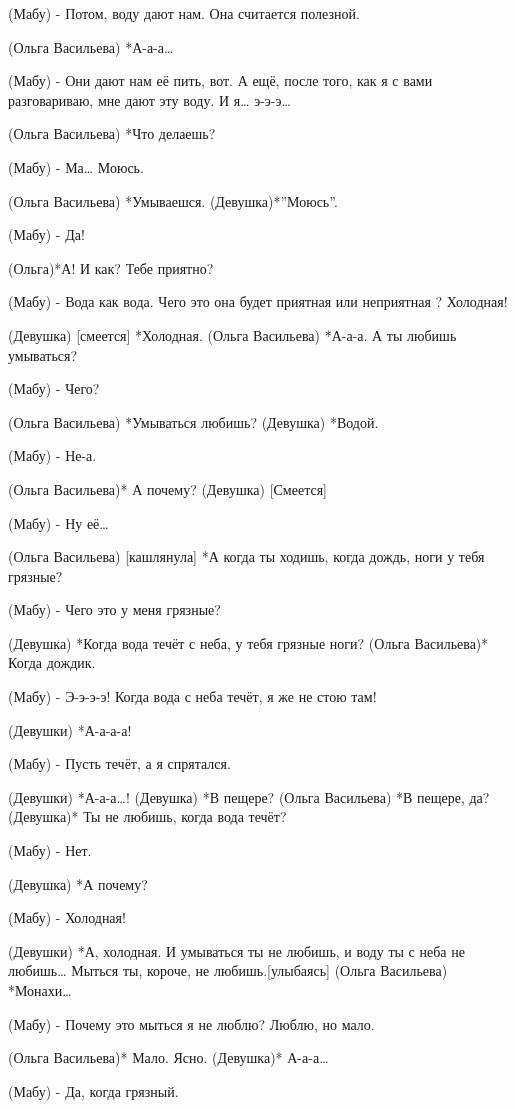 (Мабу) - Потом, воду дают нам. Она считается полезной.

(Ольга Васильева) *А-а-а…

(Мабу)  - Они дают нам её пить, вот. А ещё, после того, как я с вами разговариваю,  мне дают эту воду. И я… э-э-э…

(Ольга Васильева) *Что делаешь?

(Мабу) - Ма… Моюсь.
 
(Ольга Васильева) *Умываешся.
(Девушка)*”Моюсь”.

(Мабу) - Да!

(Ольга)*А! И как? Тебе приятно?

(Мабу) - Вода как вода. Чего это она будет  приятная или неприятная ? Холодная!

(Девушка) [смеется] *Холодная.
(Ольга Васильева) *А-а-а. А ты любишь умываться?

(Мабу) - Чего?

(Ольга Васильева) *Умываться любишь?
(Девушка) *Водой.

(Мабу) - Не-а.

(Ольга Васильева)* А почему?
(Девушка) [Смеется]

(Мабу) - Ну её… 

(Ольга Васильева) [кашлянула] *А когда ты ходишь, когда дождь, ноги у тебя грязные?

(Мабу) - Чего это у меня грязные?

(Девушка) *Когда вода течёт с неба, у тебя грязные ноги?
(Ольга Васильева)* Когда дождик.

(Мабу) - Э-э-э-э! Когда вода с неба течёт, я же не стою там!

(Девушки) *А-а-а-а!

(Мабу) - Пусть течёт, а я спрятался.

(Девушки) *А-а-а…!
(Девушка) *В пещере?
(Ольга Васильева) *В пещере, да?
(Девушка)* Ты не любишь, когда вода течёт?

(Мабу) - Нет.

(Девушка) *А почему?

(Мабу) - Холодная!

(Девушки) *А, холодная. И умываться ты не любишь, и воду ты с неба не любишь… Мыться ты, короче, не любишь.[улыбаясь]
(Ольга Васильева) *Монахи…

(Мабу) - Почему это мыться я не люблю? Люблю, но мало.

(Ольга Васильева)* Мало. Ясно.
(Девушка)* А-а-а…

(Мабу) - Да, когда грязный.

